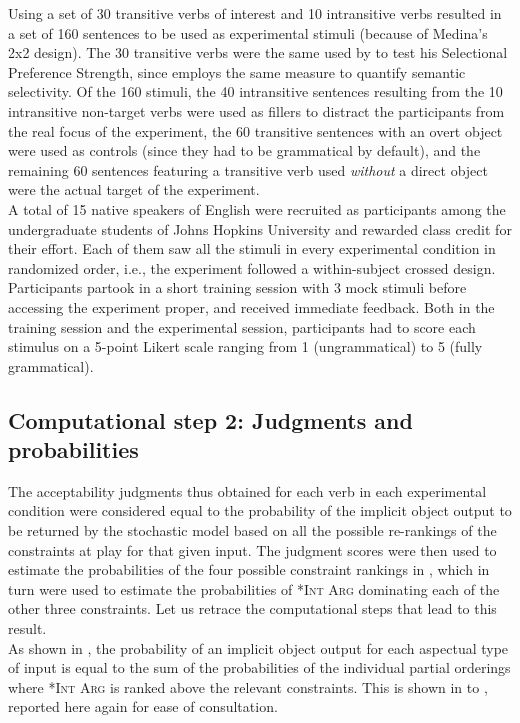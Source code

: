 Using a set of 30 transitive verbs of interest and 10 intransitive verbs resulted in a set of 160 sentences to be used as experimental stimuli (because of Medina's 2x2 design). The 30 transitive verbs were the same used by \textcite{Resnik1993, Resnik1996} to test his Selectional Preference Strength, since \textcite{Medina2007} employs the same measure to quantify semantic selectivity. Of the 160 stimuli, the 40 intransitive sentences resulting from the 10 intransitive non-target verbs were used as fillers to distract the participants from the real focus of the experiment, the 60 transitive sentences with an overt object were used as controls (since they had to be grammatical by default), and the remaining 60 sentences featuring a transitive verb used \textit{without} a direct object were the actual target of the experiment.\\
A total of 15 native speakers of English were recruited as participants among the undergraduate students of Johns Hopkins University and rewarded class credit for their effort. Each of them saw all the stimuli in every experimental condition in randomized order, i.e., the experiment followed a within-subject crossed design. Participants partook in a short training session with 3 mock stimuli before accessing the experiment proper, and received immediate feedback. Both in the training session and the experimental session, participants had to score each stimulus on a 5-point Likert scale ranging from 1 (ungrammatical) to 5 (fully grammatical).

\subsection{Computational step 2: Judgments and probabilities} The acceptability judgments thus obtained for each verb in each experimental condition were considered equal to the probability of the implicit object output to be returned by the stochastic model based on all the possible re-rankings of the constraints at play for that given input. The judgment scores were then used to estimate the probabilities of the four possible constraint rankings in , which in turn were used to estimate the probabilities of \textsc{*Int Arg} dominating each of the other three constraints. Let us retrace the computational steps that lead to this result.\\
As shown in , the probability of an implicit object output for each aspectual type of input is equal to the sum of the probabilities of the individual partial orderings where \textsc{*Int Arg} is ranked above the relevant constraints. This is shown in  to , reported here again for ease of consultation. %

